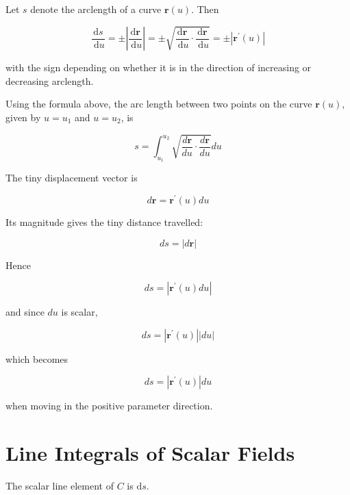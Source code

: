 \begin{nprop}
	Let $s$ denote the arclength of a curve $\mathbf{r}(u)$. Then
	
	$$
	\frac{\mathrm{d} s}{\mathrm{~d} u}= \pm\left|\frac{\mathrm{d} \mathbf{r}}{\mathrm{~d} u}\right|= \pm\sqrt{\frac{\mathrm{d} \mathbf{r}}{\mathrm{~d} u} \cdot \frac{\mathrm{d} \mathbf{r}}{\mathrm{~d} u}}=  \pm\left|\mathbf{r}^{\prime}(u)\right|
	$$
	
	with the sign depending on whether it is in the direction of increasing or decreasing arclength.
\end{nprop}

\begin{nrem}[Arclength]
	Using the formula above, the arc length between two points on the curve $\mathbf{r}(u)$, given by $u=u_1$ and $u=u_2$, is
	
	\begin{equation}
		s=\int_{u_1}^{u_2} \sqrt{\frac{d \mathbf{r}}{d u} \cdot \frac{d \mathbf{r}}{d u}} d u 
	\end{equation}
	
\end{nrem}

\begin{nmeth}
	The tiny displacement vector is
	
	$$
	d \mathbf{r}=\mathbf{r}^{\prime}(u) d u
	$$
	
	
	Its magnitude gives the tiny distance travelled:
	
	$$
	d s=|d \mathbf{r}|
	$$
	
	
	Hence
	
	$$
	d s=\left|\mathbf{r}^{\prime}(u) d u\right|
	$$
	
	and since $d u$ is scalar,
	
	$$
	d s=\left|\mathbf{r}^{\prime}(u)\right||d u|
	$$
	
	which becomes
	
	$$
	d s=\left|\mathbf{r}^{\prime}(u)\right| d u
	$$
	
	when moving in the positive parameter direction.
\end{nmeth}

\section{Line Integrals of Scalar Fields}

\begin{ndefi}
	The scalar line element of $C$ is $\mathrm{d} s$.
\end{ndefi}

